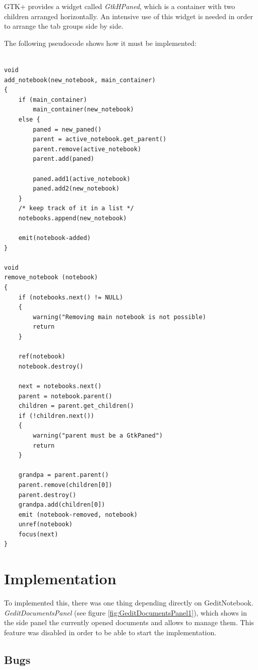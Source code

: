 GTK+ provides a widget called \emph{GtkHPaned}, which is a container with two children arranged horizontally. An intensive use of this widget is needed in order to arrange the tab groups side by side.

The following pseudocode shows how it must be implemented:
\begin{lstlisting}[style=GObject]

void
add_notebook(new_notebook, main_container)
{
	if (main_container)
		main_container(new_notebook)
	else {
		paned = new_paned()
		parent = active_notebook.get_parent()
		parent.remove(active_notebook)
		parent.add(paned)

		paned.add1(active_notebook)
		paned.add2(new_notebook)
	}
	/* keep track of it in a list */
	notebooks.append(new_notebook)

	emit(notebook-added)
}

void
remove_notebook (notebook)
{
	if (notebooks.next() != NULL)
	{
		warning("Removing main notebook is not possible)
		return
	}

	ref(notebook)
	notebook.destroy()

	next = notebooks.next()
	parent = notebook.parent()
	children = parent.get_children()
	if (!children.next())
	{
		warning("parent must be a GtkPaned")
		return
	}

	grandpa = parent.parent()
	parent.remove(children[0])
	parent.destroy()
	grandpa.add(children[0])
	emit (notebook-removed, notebook)
	unref(notebook)
	focus(next)
}

\end{lstlisting}

\newpage
\section{Implementation}

To implemented this, there was one thing depending directly on GeditNotebook. \emph{GeditDocumentsPanel} (see figure \ref{fig:GeditDocumentsPanel1}), which shows in the side panel the currently opened documents and allows to manage them. This feature was disabled in order to be able to start the implementation.


\subsection{Bugs}

